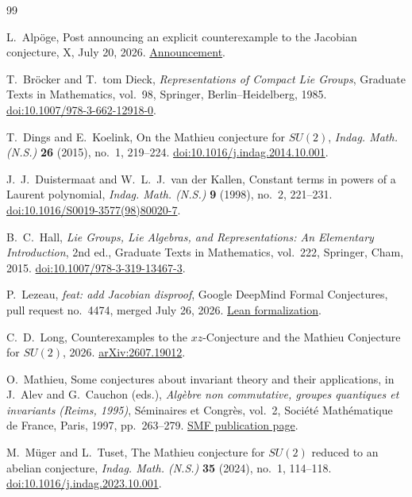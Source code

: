 \documentclass[11pt]{article}
\numberwithin{equation}{section}
\begin{document}
\begin{thebibliography}{99}

L.~Alp\"oge,
Post announcing an explicit counterexample to the Jacobian conjecture,
X, July 20, 2026.
\href{https://x.com/__alpoge__/status/2079028340955197566}{Announcement}.

T.~Br\"ocker and T.~tom Dieck,
\emph{Representations of Compact Lie Groups},
Graduate Texts in Mathematics, vol.~98, Springer, Berlin--Heidelberg, 1985.
\href{https://doi.org/10.1007/978-3-662-12918-0}{doi:10.1007/978-3-662-12918-0}.

T.~Dings and E.~Koelink,
On the Mathieu conjecture for $SU(2)$,
\emph{Indag. Math. (N.S.)} \textbf{26} (2015), no.~1, 219--224.
\href{https://doi.org/10.1016/j.indag.2014.10.001}{doi:10.1016/j.indag.2014.10.001}.

J.~J.~Duistermaat and W.~L.~J.~van der Kallen,
Constant terms in powers of a Laurent polynomial,
\emph{Indag. Math. (N.S.)} \textbf{9} (1998), no.~2, 221--231.
\href{https://doi.org/10.1016/S0019-3577(98)80020-7}{doi:10.1016/S0019-3577(98)80020-7}.

B.~C.~Hall,
\emph{Lie Groups, Lie Algebras, and Representations: An Elementary Introduction},
2nd ed., Graduate Texts in Mathematics, vol.~222, Springer, Cham, 2015.
\href{https://doi.org/10.1007/978-3-319-13467-3}{doi:10.1007/978-3-319-13467-3}.

P.~Lezeau,
\emph{feat: add Jacobian disproof},
Google DeepMind Formal Conjectures, pull request no.~4474,
merged July 26, 2026.
\href{https://github.com/google-deepmind/formal-conjectures/pull/4474}{Lean formalization}.

C.~D.~Long,
Counterexamples to the $xz$-Conjecture and the Mathieu Conjecture for $SU(2)$,
2026.
\href{https://arxiv.org/abs/2607.19012}{arXiv:2607.19012}.

O.~Mathieu,
Some conjectures about invariant theory and their applications,
in J.~Alev and G.~Cauchon (eds.),
\emph{Alg\`ebre non commutative, groupes quantiques et invariants
(Reims, 1995)},
S\'eminaires et Congr\`es, vol.~2, Soci\'et\'e Math\'ematique de France, Paris,
1997, pp.~263--279.
\href{https://smf.emath.fr/publications/some-conjectures-about-invariant-theory-and-their-applications}{SMF publication page}.

M.~M\"uger and L.~Tuset,
The Mathieu conjecture for $SU(2)$ reduced to an abelian conjecture,
\emph{Indag. Math. (N.S.)} \textbf{35} (2024), no.~1, 114--118.
\href{https://doi.org/10.1016/j.indag.2023.10.001}{doi:10.1016/j.indag.2023.10.001}.


\end{thebibliography}
\end{document}
